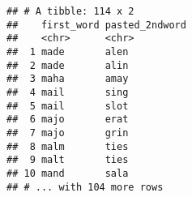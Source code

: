 \documentclass[]{article}
\begin{document}
\begin{verbatim}
## # A tibble: 114 x 2
##    first_word pasted_2ndword
##    <chr>      <chr>         
##  1 made       alen          
##  2 made       alin          
##  3 maha       amay          
##  4 mail       sing          
##  5 mail       slot          
##  6 majo       erat          
##  7 majo       grin          
##  8 malm       ties          
##  9 malt       ties          
## 10 mand       sala          
## # ... with 104 more rows
\end{verbatim}
\end{document}
